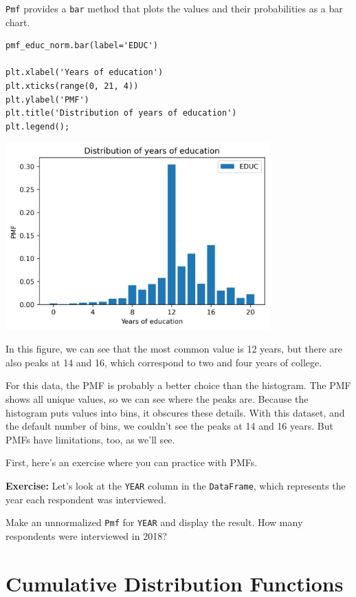 \passthrough{\lstinline!Pmf!} provides a \passthrough{\lstinline!bar!}
method that plots the values and their probabilities as a bar chart.

\begin{lstlisting}[]
pmf_educ_norm.bar(label='EDUC')

plt.xlabel('Years of education')
plt.xticks(range(0, 21, 4))
plt.ylabel('PMF')
plt.title('Distribution of years of education')
plt.legend();
\end{lstlisting}

\begin{center}
\includegraphics[width=4in]{chapters/08_distributions_files/08_distributions_48_0.png}
\end{center}

In this figure, we can see that the most common value is 12 years, but
there are also peaks at 14 and 16, which correspond to two and four
years of college.

For this data, the PMF is probably a better choice than the histogram.
The PMF shows all unique values, so we can see where the peaks are.
Because the histogram puts values into bins, it obscures these details.
With this dataset, and the default number of bins, we couldn't see the
peaks at 14 and 16 years. But PMFs have limitations, too, as we'll see.

First, here's an exercise where you can practice with PMFs.

\textbf{Exercise:} Let's look at the \passthrough{\lstinline!YEAR!}
column in the \passthrough{\lstinline!DataFrame!}, which represents the
year each respondent was interviewed.

Make an unnormalized \passthrough{\lstinline!Pmf!} for
\passthrough{\lstinline!YEAR!} and display the result. How many
respondents were interviewed in 2018?

\hypertarget{cumulative-distribution-functions}{%
\section{Cumulative Distribution
Functions}\label{cumulative-distribution-functions}}

